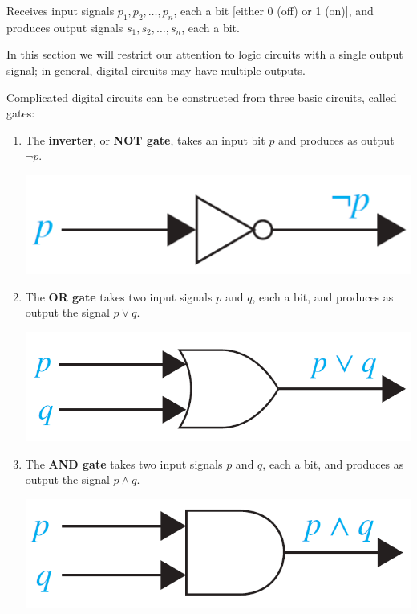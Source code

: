 \begin{tcolorbox}[title=Definition: Logic circuit (digital circuit)]
Receives input signals $p_1, p_2,\ldots, p_n$, each a bit [either 0 (off) or 1 (on)], and produces output signals $s_1, s_2,\ldots, s_n$, each a bit.  
\end{tcolorbox}
\begin{tcolorbox}[colback=white, colframe=gray!60, title=Remark 1]
In this section we will
restrict our attention to logic circuits with a single output signal; in general, digital circuits may
have multiple outputs.
\end{tcolorbox}
\begin{tcolorbox}[title=Definition: Basic Logic Gates]
Complicated digital circuits can be constructed from three basic circuits, called gates:

\begin{enumerate}
    \item The \textbf{inverter}, or \textbf{NOT gate}, takes an input bit $p$ and produces as output $\neg p$.
\begin{center}
    \includegraphics[width=0.3\linewidth]{chp1_2_applogic/inv.png}
\end{center}
    \item The \textbf{OR gate} takes two input signals $p$ and $q$, each a bit, and produces as output the signal $p\lor q$.
\begin{center}
    \includegraphics[width=0.3\linewidth]{chp1_2_applogic/or.png}
\end{center}
    \item The \textbf{AND gate} takes two input signals $p$ and $q$, each a bit, and produces as output the signal $p\land q$.
\begin{center}
    \includegraphics[width=0.3\linewidth]{chp1_2_applogic/and.png}
\end{center}
\end{enumerate}
\end{tcolorbox}

